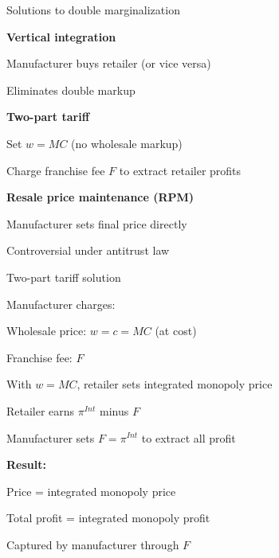 \documentclass[notes,11pt, aspectratio=169]{beamer}
\newenvironment{wideitemize}{\itemize\addtolength{\itemsep}{10pt}}{\enditemize}
\newenvironment{wideenumerate}{\enumerate\addtolength{\itemsep}{10pt}}{\endenumerate}
\begin{document}
\begin{frame}{Solutions to double marginalization}
	\begin{wideenumerate}
		\item \textbf{Vertical integration}
		\begin{wideitemize}
			\vspace{3pt}
			\item Manufacturer buys retailer (or vice versa)
			\item Eliminates double markup
		\end{wideitemize}
		\item \textbf{Two-part tariff}
		\begin{wideitemize}
			\vspace{3pt}
			\item Set $w = MC$ (no wholesale markup)
			\item Charge franchise fee $F$ to extract retailer profits
		\end{wideitemize}
		\item \textbf{Resale price maintenance (RPM)}
		\begin{wideitemize}
			\vspace{3pt}
			\item Manufacturer sets final price directly
			\item Controversial under antitrust law
		\end{wideitemize}
	\end{wideenumerate}
\end{frame}

\begin{frame}{Two-part tariff solution}
	\begin{wideitemize}
		\item Manufacturer charges:
		\begin{wideitemize}
			\vspace{5pt}
			\item Wholesale price: $w = c = MC$ (at cost)
			\item Franchise fee: $F$
		\end{wideitemize}
		\item With $w = MC$, retailer sets integrated monopoly price
		\item Retailer earns $\pi^{Int}$ minus $F$
		\item Manufacturer sets $F = \pi^{Int}$ to extract all profit
		\item \textbf{Result:}
		\begin{wideitemize}
			\vspace{5pt}
			\item Price = integrated monopoly price
			\item Total profit = integrated monopoly profit
			\item Captured by manufacturer through $F$
		\end{wideitemize}
	\end{wideitemize}
\end{frame}
\end{document}

